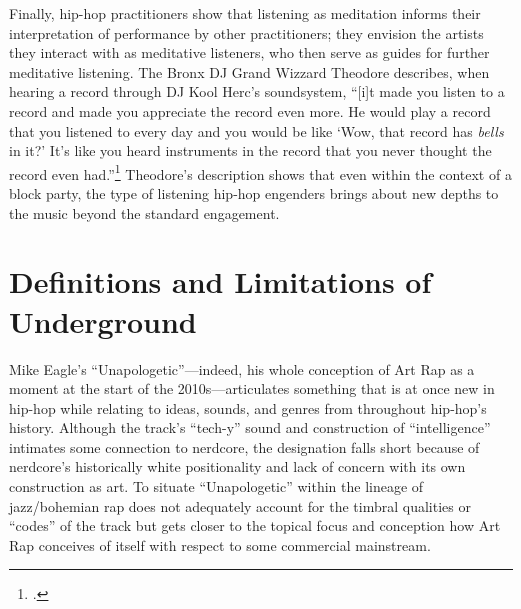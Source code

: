 Finally, hip-hop practitioners show that listening as meditation informs their interpretation of
performance by other practitioners; they envision the artists they interact with as meditative
listeners, who then serve as guides for further meditative listening. The Bronx DJ Grand Wizzard
Theodore describes, when hearing a record through DJ Kool Herc's soundsystem, ``[i]t made you
listen to a record and made you appreciate the record even more. He would play a record that 
you listened to every day and you would be like `Wow, that record has \emph{bells} in it?' It's 
like you heard instruments in the record that you never thought the record even had.''\footnote{
\autocite[139]{christabronGlassHiphopProduction2015}.} Theodore's description shows that even
within the context of a block party, the type of listening hip-hop engenders brings about new
depths to the music beyond the standard engagement.

\section{Definitions and Limitations of Underground}

Mike Eagle's ``Unapologetic''---indeed, his whole conception of Art Rap as a moment at the start
of the 2010s---articulates something that is at once new in hip-hop while relating to ideas, sounds,
and genres from throughout hip-hop's history. Although the track's ``tech-y'' sound and construction 
of ``intelligence'' intimates some connection to nerdcore, the designation falls short because of 
nerdcore's historically white positionality and lack of concern with its own construction as art. To
situate ``Unapologetic'' within the lineage of jazz/bohemian rap does not adequately account for the 
timbral qualities or ``codes'' of the track but gets closer to the topical focus and conception how
Art Rap conceives of itself with respect to some commercial mainstream. 


